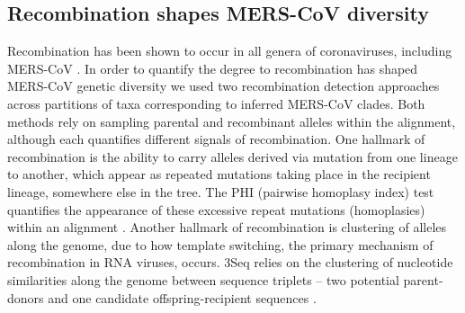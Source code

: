 \documentclass[9pt,lineno]{elife}
\begin{document}
\subsection*{Recombination shapes MERS-CoV diversity}
Recombination has been shown to occur in all genera of coronaviruses, including MERS-CoV \citep{lai_1985,makino_1986,keck_1988,kottier_1995,herrewegh_1998}.
In order to quantify the degree to recombination has shaped MERS-CoV genetic diversity we used two recombination detection approaches across partitions of taxa corresponding to inferred MERS-CoV clades.
Both methods rely on sampling parental and recombinant alleles within the alignment, although each quantifies different signals of recombination.
One hallmark of recombination is the ability to carry alleles derived via mutation from one lineage to another, which appear as repeated mutations taking place in the recipient lineage, somewhere else in the tree.
The PHI (pairwise homoplasy index) test quantifies the appearance of these excessive repeat mutations (homoplasies) within an alignment \citep{bruen_simple_2006}.
Another hallmark of recombination is clustering of alleles along the genome, due to how template switching, the primary mechanism of recombination in RNA viruses, occurs.
3Seq relies on the clustering of nucleotide similarities along the genome between sequence triplets -- two potential parent-donors and one candidate offspring-recipient sequences \citep{boni_exact_2007}.
\end{document}
